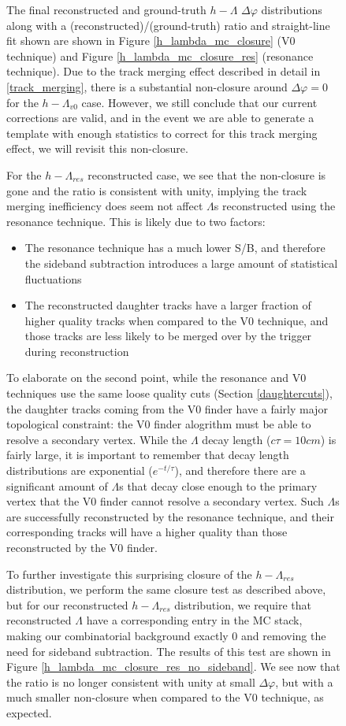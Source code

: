 \documentclass[ALICE,manyauthors]{ALICE_analysis_notes}
\begin{document}
\begin{figure}[ht]
The final reconstructed and ground-truth $h-\Lambda$ $\Delta\varphi$ distributions along with a (reconstructed)/(ground-truth) ratio and straight-line fit shown are shown in Figure \ref{h_lambda_mc_closure} (V0 technique) and Figure \ref{h_lambda_mc_closure_res} (resonance technique). Due to the track merging effect described in detail in \Section \ref{track_merging}, there is a substantial non-closure around $\Delta\varphi = 0$ for the $h-\Lambda_{v0}$ case. However, we still conclude that our current corrections are valid, and in the event we are able to generate a template with enough statistics to correct for this track merging effect, we will revisit this non-closure.  

For the $h-\Lambda_{res}$ reconstructed case, we see that the non-closure is gone and the ratio is consistent with unity, implying the track merging inefficiency does seem not affect $\Lambda$s reconstructed using the resonance technique. This is likely due to two factors:
\begin{itemize}
\item The resonance technique has a much lower S/B, and therefore the sideband subtraction introduces a large amount of statistical fluctuations
\item The reconstructed daughter tracks have a larger fraction of higher quality tracks when compared to the V0 technique, and those tracks are less likely to be merged over by the trigger during reconstruction
\end{itemize}

To elaborate on the second point, while the resonance and V0 techniques use the same loose quality cuts (Section \ref{daughtercuts}), the daughter tracks coming from the V0 finder have a fairly major topological constraint: the V0 finder alogrithm must be able to resolve a secondary vertex. While the $\Lambda$ decay length ($c\tau = 10 cm$) is fairly large, it is important to remember that decay length distributions are exponential ($e^{-t/\tau}$), and therefore there are a significant amount of $\Lambda$s that decay close enough to the primary vertex that the V0 finder cannot resolve a secondary vertex. Such $\Lambda$s are successfully reconstructed by the resonance technique, and their corresponding tracks will have a higher quality than those reconstructed by the V0 finder.

To further investigate this surprising closure of the $h-\Lambda_{res}$ distribution, we perform the same closure test as described above, but for our reconstructed $h-\Lambda_{res}$ distribution, we require that reconstructed $\Lambda$ have a corresponding entry in the MC stack, making our combinatorial background exactly 0 and removing the need for sideband subtraction. The results of this test are shown in Figure \ref{h_lambda_mc_closure_res_no_sideband}. We see now that the ratio is no longer consistent with unity at small $\Delta\varphi$, but with a much smaller non-closure when compared to the V0 technique, as expected.


\end{figure}
\end{document}
